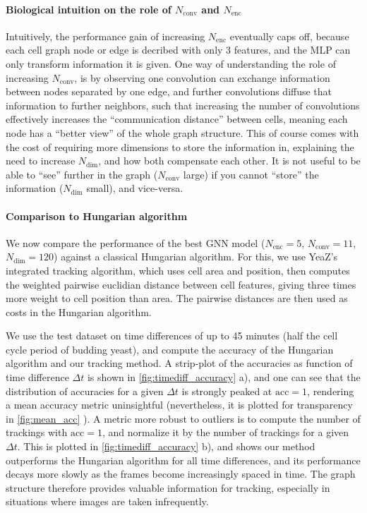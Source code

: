 \documentclass[10pt,conference,compsocconf,a4paper]{IEEEtran}
\newcommand*{\shortautoref}[1]{%
	\begingroup
	\def\equationautorefname{\textsc{Eq.}}%
	\def\tableautorefname{\textsc{Tab.}}%
	\def\figureautorefname{\textsc{Fig.}}%
	\autoref{#1}%
	\endgroup
}
\begin{document}
		\paragraph*{Biological intuition on the role of $N_\text{conv}$ and $N_\text{enc}$} Intuitively, the performance gain of increasing $N_\textrm{enc}$ eventually caps off, because each cell graph node or edge is decribed with only 3 features, and the MLP can only transform information it is given. One way of understanding the role of increasing $N_\textrm{conv}$, is by observing one convolution can exchange information between nodes separated by one edge, and further convolutions diffuse that information to further neighbors, such that increasing the number of convolutions effectively increases the  ``communication distance'' between cells, meaning each node has a ``better view'' of the whole graph structure. This of course comes with the cost of requiring more dimensions to store the information in, explaining the need to increase $N_\textrm{dim}$, and how both compensate each other. It is not useful to be able to ``see'' further in the graph ($N_\textrm{conv}$ large) if you cannot ``store'' the information ($N_\textrm{dim}$ small), and vice-versa.

		\paragraph*{Comparison to Hungarian algorithm} We now compare the performance of the best GNN model ($N_\textrm{enc}=5$, $N_\textrm{conv}=11$, $N_\textrm{dim}=120$) against a classical Hungarian algorithm. For this, we use YeaZ's integrated tracking algorithm, which uses cell area and position, then computes the weighted pairwise euclidian distance between cell features, giving three times more weight to cell position than area. The pairwise distances are then used as costs in the Hungarian algorithm.

		We use the test dataset on time differences of up to 45 minutes (half the cell cycle period of budding yeast), and compute the accuracy of the Hungarian algorithm and our tracking method.
		A strip-plot of the accuracies as function of time difference $\Delta t$ is shown in \shortautoref{fig:timediff_accuracy} a), and one can see that the distribution of accuracies for a given $\Delta t$ is strongly peaked at $\text{acc}=1$, rendering a mean accuracy metric uninsightful (nevertheless, it is plotted for transparency in \shortautoref{fig:mean_acc}). A metric more robust to outliers is to compute the number of trackings with $\text{acc} = 1$, and normalize it by the number of trackings for a given $\Delta t$. This is plotted in \shortautoref{fig:timediff_accuracy} b), and shows our method outperforms the Hungarian algorithm for all time differences, and its performance decays more slowly as the frames become increasingly spaced in time. The graph structure therefore provides valuable information for tracking, especially in situations where images are taken infrequently.
\end{document}
